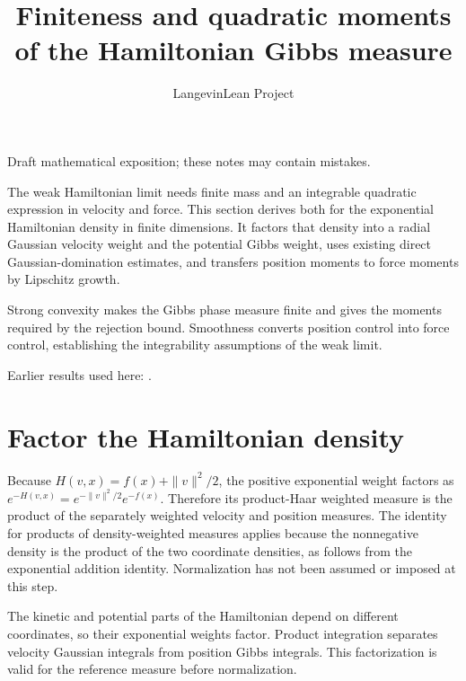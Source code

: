 \documentclass[11pt,a4paper]{article}
\title{\texorpdfstring{Finiteness and quadratic moments of the Hamiltonian Gibbs measure}{Finiteness and quadratic moments of the Hamiltonian Gibbs measure}}
\author{LangevinLean Project}
\date{}
\begin{document}
\maketitle
Draft mathematical exposition; these notes may contain mistakes.


The weak Hamiltonian limit needs finite mass and an integrable quadratic expression in velocity and force. This section derives both for the exponential Hamiltonian density in finite dimensions. It factors that density into a radial Gaussian velocity weight and the potential Gibbs weight, uses existing direct Gaussian-domination estimates, and transfers position moments to force moments by Lipschitz growth.



Strong convexity makes the Gibbs phase measure finite and gives the moments required by the rejection bound. Smoothness converts position control into force control, establishing the integrability assumptions of the weak limit.



Earlier results used here: \cite[Section~3.26]{LangevinLean2026ULASC}.

\section{\texorpdfstring{Factor the Hamiltonian density}{Factor the Hamiltonian density}}


Because \(H(v,x)=f(x)+\|v\|^2/2\), the positive exponential weight factors as \(e^{-H(v,x)}=e^{-\|v\|^2/2}e^{-f(x)}\). Therefore its product-Haar weighted measure is the product of the separately weighted velocity and position measures. The identity for products of density-weighted measures applies because the nonnegative density is the product of the two coordinate densities, as follows from the exponential addition identity. Normalization has not been assumed or imposed at this step.



The kinetic and potential parts of the Hamiltonian depend on different coordinates, so their exponential weights factor. Product integration separates velocity Gaussian integrals from position Gibbs integrals. This factorization is valid for the reference measure before normalization.
\end{document}

